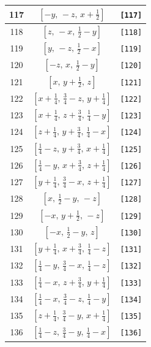 \documentclass[fleqn,8pt]{jsarticle}
\begin{document}
\begin{longtable}{ccc}
117 & $\left[ - y,\, - z,\, x + \frac{1}{2} \right]$ & {\tt [117]} \\ \hline
118 & $\left[ z,\, - x,\, \frac{1}{2} - y \right]$ & {\tt [118]} \\ \hline
119 & $\left[ y,\, - z,\, \frac{1}{2} - x \right]$ & {\tt [119]} \\ \hline
120 & $\left[ - z,\, x,\, \frac{1}{2} - y \right]$ & {\tt [120]} \\ \hline
121 & $\left[ x,\, y + \frac{1}{2},\, z \right]$ & {\tt [121]} \\ \hline
122 & $\left[ x + \frac{1}{4},\, \frac{3}{4} - z,\, y + \frac{1}{4} \right]$ & {\tt [122]} \\ \hline
123 & $\left[ x + \frac{1}{4},\, z + \frac{3}{4},\, \frac{1}{4} - y \right]$ & {\tt [123]} \\ \hline
124 & $\left[ z + \frac{1}{4},\, y + \frac{3}{4},\, \frac{1}{4} - x \right]$ & {\tt [124]} \\ \hline
125 & $\left[ \frac{1}{4} - z,\, y + \frac{3}{4},\, x + \frac{1}{4} \right]$ & {\tt [125]} \\ \hline
126 & $\left[ \frac{1}{4} - y,\, x + \frac{3}{4},\, z + \frac{1}{4} \right]$ & {\tt [126]} \\ \hline
127 & $\left[ y + \frac{1}{4},\, \frac{3}{4} - x,\, z + \frac{1}{4} \right]$ & {\tt [127]} \\ \hline
128 & $\left[ x,\, \frac{1}{2} - y,\, - z \right]$ & {\tt [128]} \\ \hline
129 & $\left[ - x,\, y + \frac{1}{2},\, - z \right]$ & {\tt [129]} \\ \hline
130 & $\left[ - x,\, \frac{1}{2} - y,\, z \right]$ & {\tt [130]} \\ \hline
131 & $\left[ y + \frac{1}{4},\, x + \frac{3}{4},\, \frac{1}{4} - z \right]$ & {\tt [131]} \\ \hline
132 & $\left[ \frac{1}{4} - y,\, \frac{3}{4} - x,\, \frac{1}{4} - z \right]$ & {\tt [132]} \\ \hline
133 & $\left[ \frac{1}{4} - x,\, z + \frac{3}{4},\, y + \frac{1}{4} \right]$ & {\tt [133]} \\ \hline
134 & $\left[ \frac{1}{4} - x,\, \frac{3}{4} - z,\, \frac{1}{4} - y \right]$ & {\tt [134]} \\ \hline
135 & $\left[ z + \frac{1}{4},\, \frac{3}{4} - y,\, x + \frac{1}{4} \right]$ & {\tt [135]} \\ \hline
136 & $\left[ \frac{1}{4} - z,\, \frac{3}{4} - y,\, \frac{1}{4} - x \right]$ & {\tt [136]} \\ \hline

\end{longtable}
\end{document}
